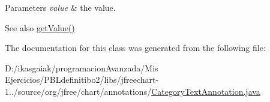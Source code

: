 \begin{DoxyParams}{Parameters}
{\em value} & the value.\\
\hline
\end{DoxyParams}
\begin{DoxySeeAlso}{See also}
\mbox{\hyperlink{classorg_1_1jfree_1_1chart_1_1annotations_1_1_category_text_annotation_ac041de5a5281948b0bd12e2442a9d248}{get\+Value()}} 
\end{DoxySeeAlso}


The documentation for this class was generated from the following file\+:\begin{DoxyCompactItemize}
\item 
D\+:/ikasgaiak/programacion\+Avanzada/\+Mis Ejercicios/\+P\+B\+Ldefinitibo2/libs/jfreechart-\/1../source/org/jfree/chart/annotations/\mbox{\hyperlink{_category_text_annotation_8java}{Category\+Text\+Annotation.\+java}}\end{DoxyCompactItemize}
